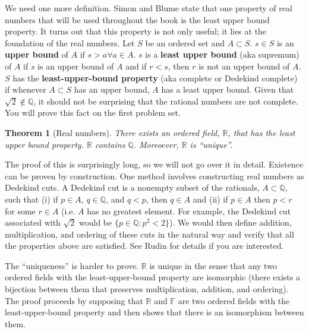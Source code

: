 \documentclass[12pt,reqno]{amsart}
\newtheorem{theorem}{Theorem}[section]
\theoremstyle{definition}
\begin{document}
We need one more definition. Simon and Blume state that one property
of real numbers that will be used throughout the book is the least
upper bound property. It turns out that this property is not only
useful; it lies at the foundation of the real numbers. Let $S$ be an
ordered set and $A \subset S$. $s \in S$ is an \textbf{upper bound} of
$A$ if $s > a \forall a \in A$. $s$ is a \textbf{least upper bound}
(aka supremum) of $A$ if $s$ is an upper bound of $A$ and if $r < s$,
then $r$ is not an upper bound of $A$. $S$ has the
\textbf{least-upper-bound property} (aka complete or Dedekind
complete) if whenever $A \subset S$ has an upper bound, $A$ has a
least upper bound. Given that $\sqrt{2} \not\in \mathbb{Q}$, it should
not be surprising that the rational numbers are not complete. You will
prove this fact on the first problem set. 

\begin{theorem}[Real numbers]
  There exists an ordered field, $\mathbb{R}$, that has the least
  upper bound property. $\mathbb{R}$ contains $\mathbb{Q}$. Moreoever,
  $\mathbb{R}$ is ``unique''.
\end{theorem}

The proof of this is surprisingly long, so we will not go over it in
detail. Existence can be proven by construction. One method involves
constructing real numbers as Dedekind cuts. A Dedekind cut is a
nonempty subset of the rationals, $A \subset \mathbb{Q}$, such that
(i) if $p \in A$, $q \in \mathbb{Q}$, and $q < p$, then $q \in A$ and
(ii) if $p \in A$ then $p<r$ for some $r \in A$ (i.e. $A$ has no
greatest element. For example, the Dedekind cut associated with
$\sqrt{2}$ would be $\{p \in \mathbb{Q}: p^2 < 2\}$). We would then
define addition, multiplication, and ordering of these cuts in the
natural way and verify that all the properties above are
satisfied. See Rudin for details if you are interested.

The ``uniqueness'' is harder to prove. $\mathbb{R}$ is unique in the
sense that any two ordered fields with the least-upper-bound property
are isomorphic (there exists a bijection between them that preserves
multiplication, addition, and ordering). The proof proceeds by
supposing that $\mathbb{R}$ and $\mathbb{F}$ are two ordered fields
with the least-upper-bound property and then shows that there is an
isomorphism between them.
\end{document}
